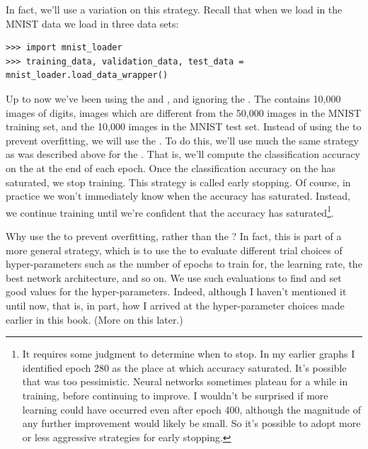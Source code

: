 \documentclass[a4paper,twoside,10pt]{book}
\begin{document}
In fact, we'll use a variation on this strategy. Recall that when we load in the MNIST data we load in three data sets:
\begin{lstlisting}
>>> import mnist_loader 
>>> training_data, validation_data, test_data = mnist_loader.load_data_wrapper()

\end{lstlisting}
Up to now we've been using the  and , and ignoring the . The  contains 10,000 images of digits, images which are different from the 50,000 images in the MNIST training set, and the 10,000 images in the MNIST test set. Instead of using the  to prevent overfitting, we will use the . To do this, we'll use much the same strategy as was described above for the . That is, we'll compute the classification accuracy on the  at the end of each epoch. Once the classification accuracy on the  has saturated, we stop training. This strategy is called early stopping. Of course, in practice we won't immediately know when the accuracy has saturated. Instead, we continue training until we're confident that the accuracy has saturated\footnote{It requires some judgment to determine when to stop. In my earlier graphs I identified epoch 280 as the place at which accuracy saturated. It's possible that was too pessimistic. Neural networks sometimes plateau for a while in training, before continuing to improve. I wouldn't be surprised if more learning could have occurred even after epoch 400, although the magnitude of any further improvement would likely be small. So it's possible to adopt more or less aggressive strategies for early stopping.}.

Why use the  to prevent overfitting, rather than the ? In fact, this is part of a more general strategy, which is to use the  to evaluate different trial choices of hyper-parameters such as the number of epochs to train for, the learning rate, the best network architecture, and so on. We use such evaluations to find and set good values for the hyper-parameters. Indeed, although I haven't mentioned it until now, that is, in part, how I arrived at the hyper-parameter choices made earlier in this book. (More on this later.)
\end{document}
